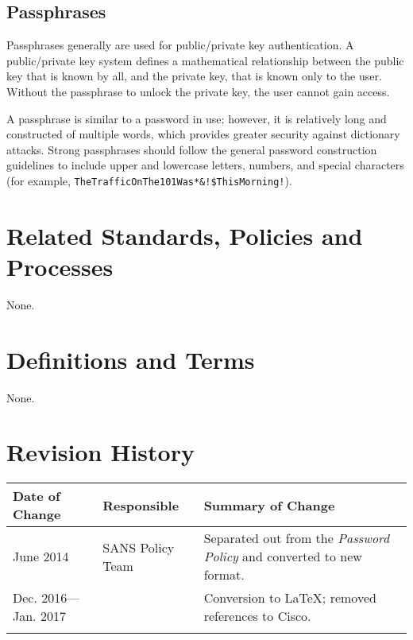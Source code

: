 \subsection{Passphrases}
Passphrases generally are used for public/private key authentication.  
A public/private key system defines a mathematical relationship between the public key that is known by all, and the private key, that is known only to the user.  
Without the passphrase to unlock the private key, the user cannot gain access.

A passphrase is similar to a password in use; however, it is relatively long and constructed of multiple words, which provides greater security against dictionary attacks.  
Strong passphrases should follow the general password construction guidelines to include upper and lowercase letters, numbers, and special characters (for example, \texttt{TheTrafficOnThe101Was*\&!\$ThisMorning!}).

\CommonPolicyCompliance
\section{Related Standards, Policies\oxford{} and Processes}
None.
\section{Definitions and Terms}
None.
\section{Revision History}
\begin{tabular}{|p{1.25in}|p{1.25in}|p{3in}|}
\hline
	Date of Change&
	Responsible&
	Summary of Change\\
\hline
	June 2014&
	SANS Policy Team&
	Separated out from the \textsl{Password Policy} and converted to new format.\\
\hline
	Dec. 2016---Jan. 2017&
	\xio{}&
	Conversion to \LaTeX{}; removed references to Cisco.\\
\hline
	 &
	 &
	 \\
\hline
\end{tabular}
